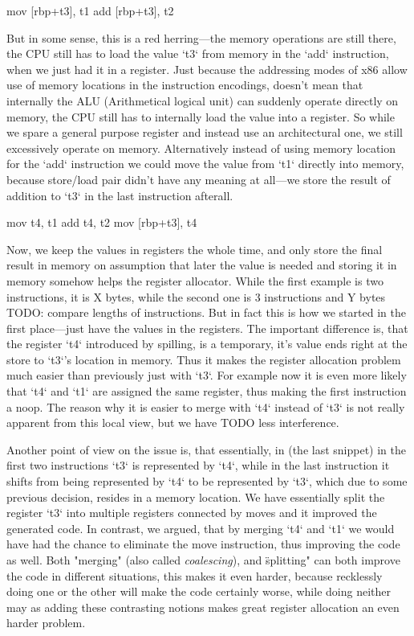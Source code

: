 \begtt
mov [rbp+t3], t1
add [rbp+t3], t2
\endtt

But in some sense, this is a red herring---the memory operations are still
there, the CPU still has to load the value `t3` from memory in the `add`
instruction, when we just had it in a register. Just because the addressing
modes of x86 allow use of memory locations in the instruction encodings, doesn't
mean that internally the ALU (Arithmetical logical unit) can suddenly operate
directly on memory, the CPU still has to internally load the value into a
register. So while we spare a general purpose register and instead use an
architectural one, we still excessively operate on memory. Alternatively instead of
using memory location for the `add` instruction we could move the value from
`t1` directly into memory, because store/load pair didn't have any meaning at
all---we store the result of addition to `t3` in the last instruction afterall.

\begtt
mov t4, t1
add t4, t2
mov [rbp+t3], t4
\endtt

Now, we keep the values in registers the whole time, and only store the final
result in memory on assumption that later the value is needed and storing it in
memory somehow helps the register allocator. While the first example is two
instructions, it is X bytes, while the second one is 3 instructions and Y bytes
TODO: compare lengths of instructions. But in fact this is how we started in the
first place---just have the values in the registers. The important difference
is, that the register `t4` introduced by spilling, is a temporary, it's value
ends right at the store to `t3`'s location in memory. Thus it makes the register
allocation problem much easier than previously just with `t3`. For example now
it is even more likely that `t4` and `t1` are assigned the same register, thus
making the first instruction a noop. The reason why it is easier to merge with
`t4` instead of `t3` is not really apparent from this local view, but we have
TODO less interference.

Another point of view on the issue is, that essentially, in (the last snippet)
in the first two instructions `t3` is represented by `t4`, while in the last
instruction it shifts from being represented by `t4` to be represented by `t3`,
which due to some previous decision, resides in a memory location. We have
essentially split the register `t3` into multiple registers connected by moves
and it improved the generated code. In contrast, we argued, that by merging `t4`
and `t1` we would have had the chance to eliminate the move instruction, thus
improving the code as well. Both "merging" (also called {\em coalescing}), and
\"splitting" can both improve the code in different situations, this makes it
even harder, because recklessly doing one or the other will make the code
certainly worse, while doing neither may as adding these contrasting notions
makes great register allocation an even harder problem.

